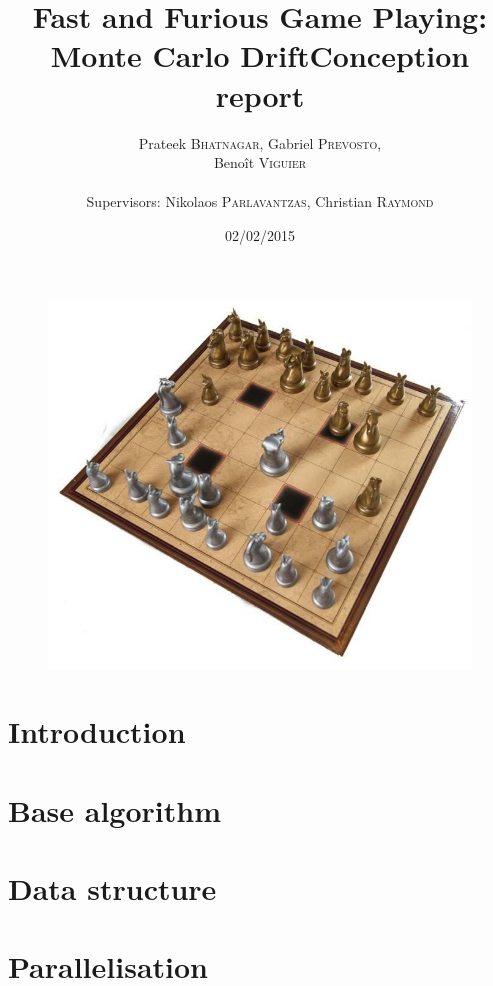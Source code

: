 \documentclass[12pt]{article}
\title{Fast and Furious Game Playing: Monte Carlo Drift\smallbreak Conception report} %
\author{Prateek \textsc{Bhatnagar}, Gabriel \textsc{Prevosto}, \\
        Benoît \textsc{Viguier} \\
        \\
        Supervisors: Nikolaos \textsc{Parlavantzas}, Christian \textsc{Raymond}}
\date{02/02/2015}
\begin{document}
\maketitle

\begin{figure}[!h] 
\centerline{\includegraphics[scale=0.50]{Pictures/arimaa}}
\end{figure}
\newpage

\tableofcontents
\newpage


\section{Introduction}				\label{sec:introduction} 		

\newpage
\section{Base algorithm}			\label{sec:Algo}			

\newpage
\section{Data structure}			\label{sec:DS}				

\newpage
\section{Parallelisation}			\label{sec:parallelisation}
\end{document}
